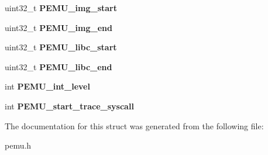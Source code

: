 \begin{DoxyCompactItemize}
\item 
\hypertarget{structPEMU__exec__stats_aacec8628ae1e65eef2261af5e028a24f}{uint32\-\_\-t {\bfseries \-P\-E\-M\-U\-\_\-img\-\_\-start}}\label{structPEMU__exec__stats_aacec8628ae1e65eef2261af5e028a24f}

\item 
\hypertarget{structPEMU__exec__stats_a511d8d65af87bd6cb96ff7d9be6c7d0e}{uint32\-\_\-t {\bfseries \-P\-E\-M\-U\-\_\-img\-\_\-end}}\label{structPEMU__exec__stats_a511d8d65af87bd6cb96ff7d9be6c7d0e}

\item 
\hypertarget{structPEMU__exec__stats_a15ca270e1cc2ea19f9702a6835c8021e}{uint32\-\_\-t {\bfseries \-P\-E\-M\-U\-\_\-libc\-\_\-start}}\label{structPEMU__exec__stats_a15ca270e1cc2ea19f9702a6835c8021e}

\item 
\hypertarget{structPEMU__exec__stats_ad3aa900c11503ddfe31edd88c3e9939a}{uint32\-\_\-t {\bfseries \-P\-E\-M\-U\-\_\-libc\-\_\-end}}\label{structPEMU__exec__stats_ad3aa900c11503ddfe31edd88c3e9939a}

\item 
\hypertarget{structPEMU__exec__stats_ae6faa9fbbb59f03aefa654fb0023d48f}{int {\bfseries \-P\-E\-M\-U\-\_\-int\-\_\-level}}\label{structPEMU__exec__stats_ae6faa9fbbb59f03aefa654fb0023d48f}

\item 
\hypertarget{structPEMU__exec__stats_a3cf44dddb78f90de32ba691225c7d8f6}{int {\bfseries \-P\-E\-M\-U\-\_\-start\-\_\-trace\-\_\-syscall}}\label{structPEMU__exec__stats_a3cf44dddb78f90de32ba691225c7d8f6}

\end{DoxyCompactItemize}


\-The documentation for this struct was generated from the following file\-:\begin{DoxyCompactItemize}
\item 
pemu.\-h\end{DoxyCompactItemize}
